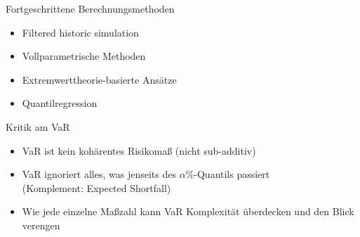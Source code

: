 \documentclass{beamer}
\begin{document}
\begin{frame}{Fortgeschrittene Berechnungsmethoden}
\begin{itemize}
\item Filtered historic simulation
\item Vollparametrische Methoden
\item Extremwerttheorie-basierte Ansätze
\item Quantilregression
\end{itemize}
\end{frame}

\begin{frame}{Kritik am VaR}
\begin{itemize}[<+->]
\item VaR ist kein kohärentes Risikomaß (nicht sub-additiv)
\item VaR ignoriert alles, was jenseits des $\alpha\%$-Quantils passiert\\
{\small\hfill (Komplement: Expected Shortfall)}
\item Wie jede einzelne Maßzahl kann VaR Komplexität überdecken und den Blick verengen  
\end{itemize}
\end{frame}
\end{document}
